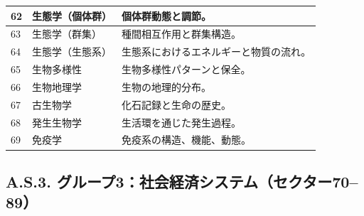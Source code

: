 \documentclass[13pt,a4paper]{ltjsarticle}
\begin{document}
\begin{longtable}{|p{0.9cm}|p{6.0cm}|p{8.6cm}|}
		\hline
		62 & 生態学（個体群） & 個体群動態と調節。 \\
		\hline
		63 & 生態学（群集） & 種間相互作用と群集構造。 \\
		\hline
		64 & 生態学（生態系） & 生態系におけるエネルギーと物質の流れ。 \\
		\hline
		65 & 生物多様性 & 生物多様性パターンと保全。 \\
		\hline
		66 & 生物地理学 & 生物の地理的分布。 \\
		\hline
		67 & 古生物学 & 化石記録と生命の歴史。 \\
		\hline
		68 & 発生生物学 & 生活環を通じた発生過程。 \\
		\hline
		69 & 免疫学 & 免疫系の構造、機能、動態。 \\
		\hline
	\end{longtable}
	
	\subsection*{A.S.3. グループ3：社会経済システム（セクター70--89）}
	
\end{document}
